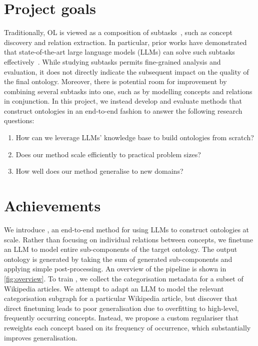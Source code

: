 \section{Project goals}

Traditionally, OL is viewed as a composition of subtasks~\cite{asim2018survey}, such as concept discovery and relation extraction. In particular, prior works have demonstrated that state-of-the-art large language models (LLMs) can solve such subtasks effectively~\cite{babaei2023llms4ol}. While studying subtasks permits fine-grained analysis and evaluation, it does not directly indicate the subsequent impact on the quality of the final ontology. Moreover, there is potential room for improvement by combining several subtasks into one, such as by modelling concepts and relations in conjunction. In this project, we instead develop and evaluate methods that construct ontologies in an end-to-end fashion to answer the following research questions:
\begin{enumerate}
    \item How can we leverage LLMs' knowledge base to build ontologies from scratch?
    \item Does our method scale efficiently to practical problem sizes?
    \item How well does our method generalise to new domains?
\end{enumerate}

\section{Achievements}



We introduce \name, an end-to-end method for using LLMs to construct ontologies at scale. Rather than focusing on individual relations between concepts, we finetune an LLM to model entire sub-components of the target ontology. The output ontology is generated by taking the sum of generated sub-components and applying simple post-processing. An overview of the pipeline is shown in \cref{fig:overview}. To train \name, we collect the categorisation metadata for a subset of Wikipedia articles. We attempt to adapt an LLM to model the relevant categorisation subgraph for a particular Wikipedia article, but discover that direct finetuning leads to poor generalisation due to overfitting to high-level, frequently occurring concepts. Instead, we propose a custom regulariser that reweights each concept based on its frequency of occurrence, which substantially improves generalisation.

